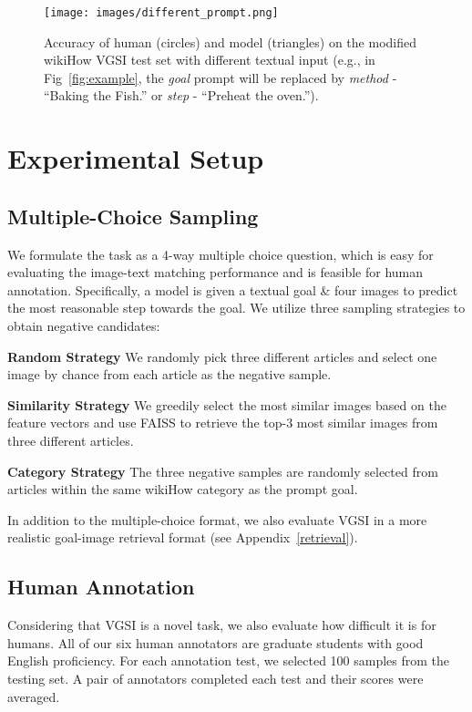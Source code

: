\documentclass[11pt]{article}
\begin{document}
\begin{figure}[!t]
\centering
    \texttt{[image: images/different\_prompt.png]}
    \caption{Accuracy of human (circles) and model (triangles) on the modified wikiHow VGSI test set with different textual input (e.g., in Fig~\ref{fig:example}, the \textit{goal} prompt will be replaced by \textit{method} - ``Baking the Fish.'' or \textit{step} - ``Preheat the oven.'').}
    \label{fig:different prompts}
\end{figure}

\section{Experimental Setup}
\subsection{Multiple-Choice Sampling}
We formulate the task as a 4-way multiple choice question, which is easy for evaluating the image-text matching performance and is feasible for human annotation. Specifically, a model is given a textual goal \& four images to predict the most reasonable step towards the goal. We utilize three sampling strategies to obtain negative candidates:

\noindent
\textbf{Random Strategy} We randomly pick three different articles and select one image by chance from each article as the negative sample.

\noindent
\textbf{Similarity Strategy} We greedily select the most similar images based on the feature vectors and use FAISS \cite{johnson2019billion} to retrieve the top-3 most similar images from three different articles.

\noindent
\textbf{Category Strategy} The three negative samples are randomly selected from articles within the same wikiHow category as the prompt goal.

In addition to the multiple-choice format, we also evaluate VGSI in a more realistic goal-image retrieval format (see Appendix~\ref{retrieval}).

\subsection{Human Annotation}
Considering that VGSI is a novel task, we also evaluate how difficult it is for humans. All of our six human annotators are graduate students with good English proficiency. For each annotation test, we selected 100 samples from the testing set. A pair of annotators completed each test and their scores were averaged.
\end{document}
